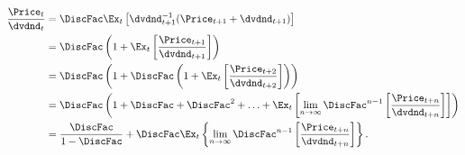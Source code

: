 \begin{equation*}\begin{gathered}\begin{aligned}
\frac{\Price_{t}}{\dvdnd_{t}} & =  \DiscFac \Ex_{t}\left[\dvdnd_{t+1}^{-1}(\Price_{t+1}+\dvdnd_{t+1})\right] \label{eq:pofdLog}
\\ & =  \DiscFac \left(1+\Ex_{t} \left[\frac{{\Price}_{t+1}}{\dvdnd_{t+1}}\right]\right)
\\ & =  \DiscFac \left(1+\DiscFac \left(1+\Ex_{t}\left[\frac{{\Price}_{t+2}}{\dvdnd_{t+2}}\right]\right)\right)
\\ & =  \DiscFac \left(1 + \DiscFac + \DiscFac^{2} + \ldots + \Ex_{t} \left[\lim_{n\rightarrow \infty}\DiscFac^{n-1}\left[\frac{\Price_{t+n}}{\dvdnd_{t+n}}\right]\right]\right)
\\ & =  \frac{\DiscFac}{1-\DiscFac} + \DiscFac \Ex_{t}\left\{\lim_{n\rightarrow \infty}\DiscFac^{n-1}\left[\frac{\Price_{t+n}}{\dvdnd_{t+n}}\right]\right\}.
\end{aligned}\end{gathered}\end{equation*}
